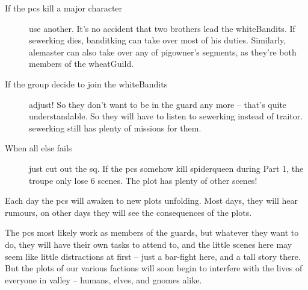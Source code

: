 \begin{multicols}{2}
\begin{description}
  \item[If the \glspl{pc} kill a major character]
  use another.
  It's no accident that two brothers lead the \gls{whiteBandits}.
  If \gls{sewerking} dies, \gls{banditking} can take over most of his duties.
  Similarly, \gls{alemaster} can also take over any of \gls{pigowner}'s \glspl{segment}, as they're both members of the \gls{wheatGuild}.
  \item[If the group decide to join the \gls{whiteBandits}]
  adjust!
  So they don't want to be in the \gls{guard} any more -- that's quite understandable.
  So they will have to listen to \gls{sewerking} instead of \gls{traitor}.
  \Gls{sewerking} still has plenty of missions for them.
  \item[When all else fails]
  just cut out the \gls{sq}.
  If the \glspl{pc} somehow kill \gls{spiderqueen} during Part 1, the troupe only lose 6 scenes.
  The plot has plenty of other scenes!
\end{description}

\renewcommand\csComments{
  \mapCircle{16}{76}{1.7}{Dyson_Logos/bandit_camp}
  \mapCircle{35}{88}{2}{Dyson_Logos/forgotten_city}
  \mapCircle{27}{09}{2}{Dyson_Logos/qualme_temple}
  \mapCircle[4]{56}{52}{2.5}{Dyson_Logos/town}
  \mapCircle{44}{41}{2}{Dyson_Logos/redfall}
  \mapCircle{83}{09}{1.7}{Dyson_Logos/shadow_gate}
  \mapCircle{86}{45}{1.7}{Dyson_Logos/lakeside}
}




\end{multicols}

\label{sqList}

\noindent
Each day the \glspl{pc} will awaken to new plots unfolding.
Most days, they will hear rumours, on other days they will see the consequences of the plots.

The \glspl{pc} most likely work as members of the \glspl{guard}, but whatever they want to do, they will have their own tasks to attend to, and the little scenes here may seem like little distractions at first -- just a bar-fight here, and a tall story there.
But the plots of our various factions will soon begin to interfere with the lives of everyone in \gls{valley} -- humans, elves, and gnomes alike.

